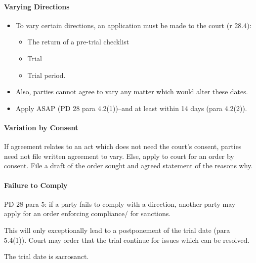\documentclass[
]{article}
\newenvironment{Shaded}{}{}
\newcommand{\NormalTok}[1]{#1}
\providecommand{\tightlist}{%
  \setlength{\itemsep}{0pt}\setlength{\parskip}{0pt}}
\begin{document}
\hypertarget{varying-directions}{%
\paragraph{Varying Directions}\label{varying-directions}}

\begin{itemize}
\tightlist
\item
  To vary certain directions, an application must be made to the court
  (r 28.4):

  \begin{itemize}
  \tightlist
  \item
    The return of a pre-trial checklist
  \item
    Trial
  \item
    Trial period.
  \end{itemize}
\item
  Also, parties cannot agree to vary any matter which would alter these
  dates.
\item
  Apply ASAP (PD 28 para 4.2(1))--and at least within 14 days (para
  4.2(2)).
\end{itemize}

\hypertarget{variation-by-consent}{%
\paragraph{Variation by Consent}\label{variation-by-consent}}

If agreement relates to an act which does not need the court's consent,
parties need not file written agreement to vary. Else, apply to court
for an order by consent. File a draft of the order sought and agreed
statement of the reasons why.

\hypertarget{failure-to-comply}{%
\paragraph{Failure to Comply}\label{failure-to-comply}}

PD 28 para 5: if a party fails to comply with a direction, another party
may apply for an order enforcing compliance/ for sanctions.

This will only exceptionally lead to a postponement of the trial date
(para 5.4(1)). Court may order that the trial continue for issues which
can be resolved.

\begin{Shaded}
\begin{Highlighting}[]
\NormalTok{The trial date is sacrosanct. }
\end{Highlighting}
\end{Shaded}
\end{document}

